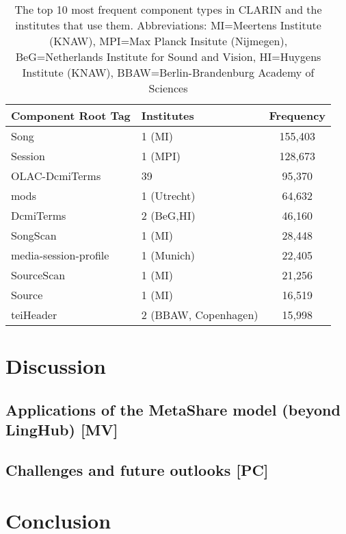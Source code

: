 \documentclass{llncs}
\begin{document}
\begin{table}
    \begin{center}
    \begin{tabular}{l|lc}
        Component Root Tag & Institutes & Frequency \\
        \hline
        Song               & 1 (MI)     & 155,403   \\
        Session            & 1 (MPI)    & 128,673   \\
        OLAC-DcmiTerms     & 39         &  95,370   \\
        mods               & 1 (Utrecht)&  64,632   \\
        DcmiTerms          & 2 (BeG,HI) &  46,160   \\
        SongScan           & 1 (MI)     &  28,448   \\
        media-session-profile  & 1 (Munich) &  22,405   \\
        SourceScan         & 1 (MI)     &  21,256   \\
        Source             & 1 (MI)     &  16,519   \\
        teiHeader          & 2 (BBAW, Copenhagen) &  15,998   \\
    \end{tabular}
    \end{center}
    \caption{\label{tab:clarin-types}The top 10 most frequent component types in
    CLARIN and the institutes that use them. Abbreviations: MI=Meertens Institute (KNAW), 
    MPI=Max Planck Insitute (Nijmegen), BeG=Netherlands Institute for Sound and Vision,
HI=Huygens Institute (KNAW), BBAW=Berlin-Brandenburg Academy of Sciences}
\end{table}

\section{Discussion}
\label{sec:discussion}

\subsection{Applications of the MetaShare model (beyond LingHub) [MV]}
\label{sec:applications}

\subsection{Challenges and future outlooks [PC]}
\label{sec:challenges}

\section{Conclusion}
\label{sec:conclusion}



\end{document}
